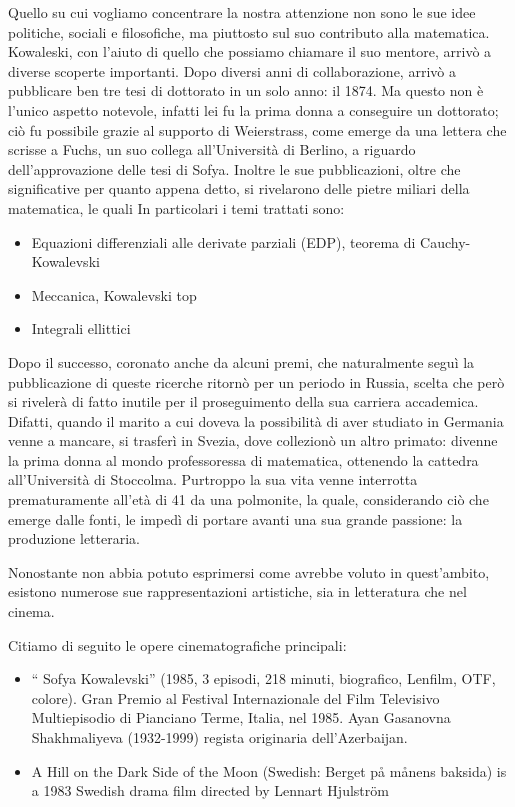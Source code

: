 Quello su cui vogliamo concentrare la nostra attenzione non sono le sue idee politiche, sociali e filosofiche, ma piuttosto sul suo contributo alla matematica. Kowaleski, con l'aiuto di quello che possiamo chiamare il suo mentore, arrivò a diverse scoperte importanti. Dopo diversi anni di collaborazione, arrivò a pubblicare ben tre tesi di dottorato in un solo anno: il 1874. Ma questo non è l'unico aspetto notevole, infatti lei fu la prima donna a conseguire un dottorato; ciò fu possibile grazie al supporto di Weierstrass, come emerge da una lettera che scrisse a Fuchs, un suo collega all'Università di Berlino, a riguardo dell'approvazione delle tesi di Sofya. Inoltre le sue pubblicazioni, oltre che significative per quanto appena detto, si rivelarono delle pietre miliari della matematica, le quali 
In particolari i temi trattati sono:
\begin{itemize}
\item Equazioni differenziali alle derivate parziali (EDP), teorema di Cauchy-Kowalevski
\item Meccanica, Kowalevski top
\item Integrali ellittici
\end{itemize}


Dopo il successo, coronato anche da alcuni premi, che naturalmente seguì la pubblicazione di queste ricerche ritornò per un periodo in Russia, scelta che però si rivelerà di fatto inutile per il proseguimento della sua carriera accademica. Difatti, quando il marito a cui doveva la possibilità di aver studiato in Germania venne a mancare, si trasferì in Svezia, dove collezionò un altro primato: divenne la prima donna al mondo professoressa di matematica, ottenendo la cattedra all'Università di Stoccolma.
Purtroppo la sua vita venne interrotta prematuramente all'età di 41 da una polmonite, la quale, considerando ciò che emerge dalle fonti, le impedì di portare avanti una sua grande passione: la produzione letteraria.

Nonostante non abbia potuto esprimersi come avrebbe voluto in quest'ambito, esistono numerose sue rappresentazioni artistiche, sia in letteratura che nel cinema.

Citiamo di seguito le opere cinematografiche principali:
\begin{itemize}
\item `` Sofya Kowalevski'' (1985, 3 episodi,
218 minuti, biografico, Lenfilm, OTF, colore). Gran Premio al Festival
Internazionale del Film Televisivo Multiepisodio di Pianciano Terme,
Italia, nel 1985. Ayan Gasanovna Shakhmaliyeva (1932-1999) regista
originaria dell'Azerbaijan.
\item A Hill on the Dark Side of the Moon (Swedish: Berget på månens baksida)
is a 1983 Swedish drama film directed by Lennart Hjulström
\end{itemize}

